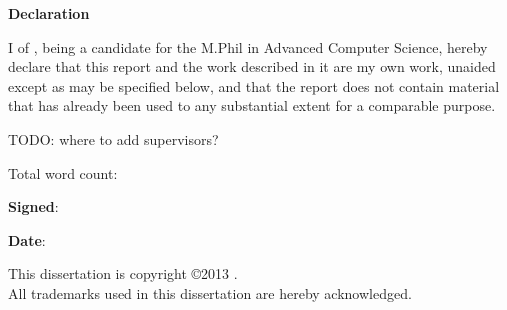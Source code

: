 \newpage
{\Huge \bf Declaration}

\vspace{24pt}

I \authorname of \authorcollege, being a candidate for the M.Phil in
Advanced Computer Science, hereby declare that this report and the
work described in it are my own work, unaided except as may be
specified below, and that the report does not contain material that
has already been used to any substantial extent for a comparable
purpose.

TODO: where to add supervisors?

\vspace{24pt}
Total word count: \wordcount

\vspace{60pt}
\textbf{Signed}:

\vspace{12pt}
\textbf{Date}:


\vfill

This dissertation is copyright \copyright 2013 \authorname.
\\
All trademarks used in this dissertation are hereby acknowledged.

\newpage
\vspace*{\fill}
